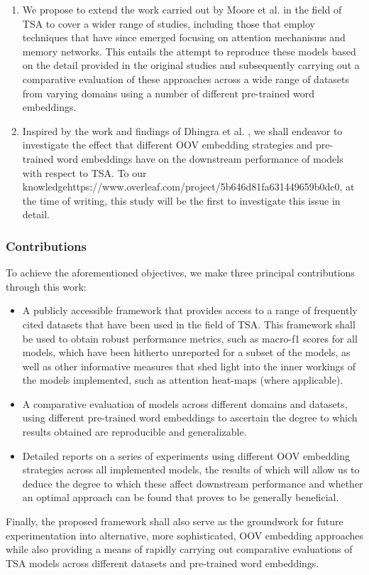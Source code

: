 \documentclass[../../fyp.tex]{subfiles}
\begin{document}
\begin{enumerate}
	\item We propose to extend the work carried out by Moore et al. \cite{moore2018} in the field of TSA to cover a wider range of studies, including those that employ techniques that have since emerged focusing on attention mechanisms and memory networks. This entails the attempt to reproduce these models based on the detail provided in the original studies and subsequently carrying out a comparative evaluation of these approaches across a wide range of datasets from varying domains using a number of different pre-trained word embeddings.
	\item Inspired by the work and findings of Dhingra et al. \cite{bhuwandhingra2017}, we shall endeavor to investigate the effect that different OOV embedding strategies and pre-trained word embeddings have on the downstream performance of models with respect to TSA. To our knowledgehttps://www.overleaf.com/project/5b646d81fa631449659b0dc0, at the time of writing, this study will be the first to investigate this issue in detail.
\end{enumerate}

\subsubsection{Contributions}

To achieve the aforementioned objectives, we make three principal contributions through this work:
\begin{itemize}
	\item A publicly accessible framework that provides access to a range of frequently cited datasets that have been used in the field of TSA. This framework shall be used to obtain robust performance metrics, such as macro-f1 scores for all models, which have been hitherto unreported for a subset of the models, as well as other informative measures that shed light into the inner workings of the models implemented, such as attention heat-maps (where applicable).
	\item A comparative evaluation of models across different domains and datasets, using different pre-trained word embeddings to ascertain the degree to which results obtained are reproducible and generalizable.
	\item Detailed reports on a series of experiments using different OOV embedding strategies across all implemented models, the results of which will allow us to deduce the degree to which these affect downstream performance and whether an optimal approach can be found that proves to be generally beneficial.
\end{itemize}

Finally, the proposed framework shall also serve as the groundwork for future experimentation into alternative, more sophisticated, OOV embedding approaches while also providing a means of rapidly carrying out comparative evaluations of TSA models across different datasets and pre-trained word embeddings.
\end{document}
